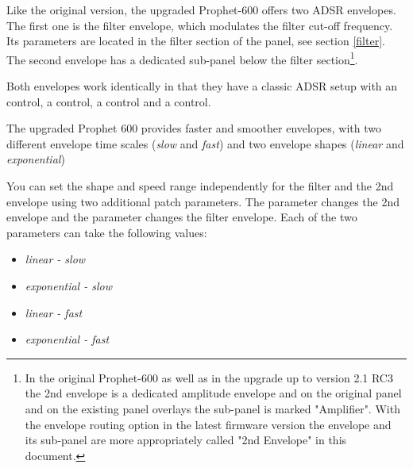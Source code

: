 Like the original version, the upgraded Prophet-600 offers two ADSR envelopes. The first one is the filter envelope, which modulates the filter cut-off frequency. Its parameters are located in the filter section of the panel, see section \ref{filter}. The second envelope has a dedicated sub-panel below the filter section\footnote{In the original Prophet-600 as well as in the upgrade up to version 2.1 RC3 the 2nd envelope is a dedicated amplitude envelope and on the original panel and on the existing panel overlays the sub-panel is marked "Amplifier". With the envelope routing option in the latest firmware version the envelope and its sub-panel are more appropriately called "2nd Envelope" in this document.}.

Both envelopes work identically in that they have a classic ADSR setup with an \attack control, a \decay control, a \sustain control and a \release control. 

\begin{center}
\end{center}

The upgraded Prophet 600 provides faster and smoother envelopes, with two different envelope time scales (\textit{slow} and \textit{fast}) and two envelope shapes (\textit{linear} and \textit{exponential})

You can set the shape and speed range independently for the filter and the 2nd envelope using two additional patch parameters. The parameter \secndenv changes the 2nd envelope and the parameter \filenv changes the filter envelope. Each of the two parameters can take the following values:

\begin{itemize}
  \setlength\itemsep{0cm}
  \item \textit{linear - slow}
  \item \textit{exponential - slow}
  \item \textit{linear - fast}
  \item \textit{exponential - fast}
\end{itemize}
 
